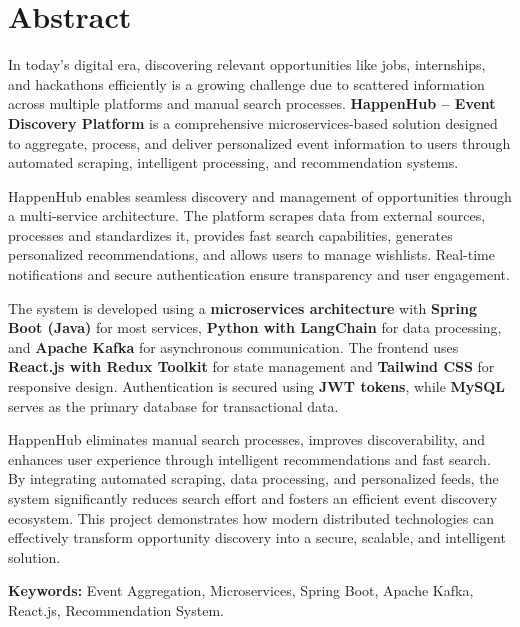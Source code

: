 \documentclass[12pt, a4paper]{report}
\begin{document}
\chapter*{Abstract} %
\noindent %
In today's digital era, discovering relevant opportunities like jobs, internships, and hackathons efficiently is a growing challenge due to scattered information across multiple platforms and manual search processes. \textbf{HappenHub – Event Discovery Platform} is a comprehensive microservices-based solution designed to aggregate, process, and deliver personalized event information to users through automated scraping, intelligent processing, and recommendation systems.

HappenHub enables seamless discovery and management of opportunities through a multi-service architecture. The platform scrapes data from external sources, processes and standardizes it, provides fast search capabilities, generates personalized recommendations, and allows users to manage wishlists. Real-time notifications and secure authentication ensure transparency and user engagement.

The system is developed using a \textbf{microservices architecture} with \textbf{Spring Boot (Java)} for most services, \textbf{Python with LangChain} for data processing, and \textbf{Apache Kafka} for asynchronous communication. The frontend uses \textbf{React.js with Redux Toolkit} for state management and \textbf{Tailwind CSS} for responsive design. Authentication is secured using \textbf{JWT tokens}, while \textbf{MySQL} serves as the primary database for transactional data.

HappenHub eliminates manual search processes, improves discoverability, and enhances user experience through intelligent recommendations and fast search. By integrating automated scraping, data processing, and personalized feeds, the system significantly reduces search effort and fosters an efficient event discovery ecosystem. This project demonstrates how modern distributed technologies can effectively transform opportunity discovery into a secure, scalable, and intelligent solution.

\vspace{24pt} %
\noindent\textbf{Keywords:} Event Aggregation, Microservices, Spring Boot, Apache Kafka, React.js, Recommendation System. %
\end{document}
